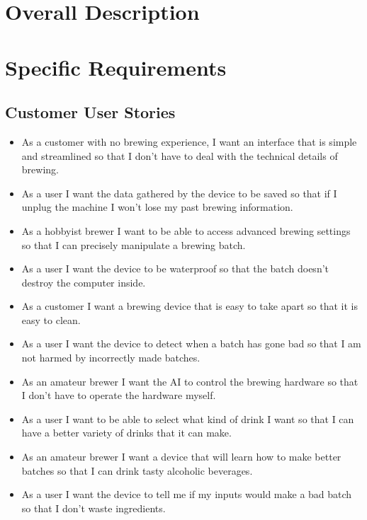 \documentclass[draftclsnofoot,onecolumn,letterpaper,10pt]{article}
\begin{document}
\section{Overall Description}


\section{Specific Requirements}
\subsection{Customer User Stories}
\begin{itemize}
	\item As a customer with no brewing experience, I want an interface that is simple and streamlined so that I don't have to deal with the technical details of brewing.
	\item As a user I want the data gathered by the device to be saved so that if I unplug the machine I won't lose my past brewing information.
	\item As a hobbyist brewer I want to be able to access advanced brewing settings so that I can precisely manipulate a brewing batch.
	\item As a user I want the device to be waterproof so that the batch doesn't destroy the computer inside.
	\item As a customer I want a brewing device that is easy to take apart so that it is easy to clean.
	\item As a user I want the device to detect when a batch has gone bad so that I am not harmed by incorrectly made batches.
	\item As an amateur brewer I want the AI to control the brewing hardware so that I don't have to operate the hardware myself.
	\item As a user I want to be able to select what kind of drink I want so that I can have a better variety of drinks that it can make.
	\item As an amateur brewer I want a device that will learn how to make better batches so that I can drink tasty alcoholic beverages.
	\item As a user I want the device to tell me if my inputs would make a bad batch so that I don't waste ingredients.
\end{itemize}
\end{document}
